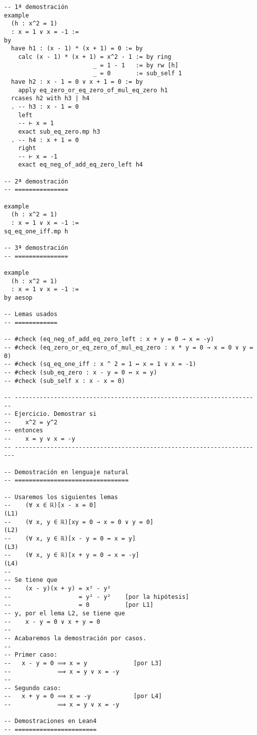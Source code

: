 \begin{verbatim}
-- 1ª demostración
example
  (h : x^2 = 1)
  : x = 1 ∨ x = -1 :=
by
  have h1 : (x - 1) * (x + 1) = 0 := by
    calc (x - 1) * (x + 1) = x^2 - 1 := by ring
                         _ = 1 - 1   := by rw [h]
                         _ = 0       := sub_self 1
  have h2 : x - 1 = 0 ∨ x + 1 = 0 := by
    apply eq_zero_or_eq_zero_of_mul_eq_zero h1
  rcases h2 with h3 | h4
  . -- h3 : x - 1 = 0
    left
    -- ⊢ x = 1
    exact sub_eq_zero.mp h3
  . -- h4 : x + 1 = 0
    right
    -- ⊢ x = -1
    exact eq_neg_of_add_eq_zero_left h4

-- 2ª demostración
-- ===============

example
  (h : x^2 = 1)
  : x = 1 ∨ x = -1 :=
sq_eq_one_iff.mp h

-- 3ª demostración
-- ===============

example
  (h : x^2 = 1)
  : x = 1 ∨ x = -1 :=
by aesop

-- Lemas usados
-- ============

-- #check (eq_neg_of_add_eq_zero_left : x + y = 0 → x = -y)
-- #check (eq_zero_or_eq_zero_of_mul_eq_zero : x * y = 0 → x = 0 ∨ y = 0)
-- #check (sq_eq_one_iff : x ^ 2 = 1 ↔ x = 1 ∨ x = -1)
-- #check (sub_eq_zero : x - y = 0 ↔ x = y)
-- #check (sub_self x : x - x = 0)

-- ---------------------------------------------------------------------
-- Ejercicio. Demostrar si
--    x^2 = y^2
-- entonces
--    x = y ∨ x = -y
-- ----------------------------------------------------------------------

-- Demostración en lenguaje natural
-- ================================

-- Usaremos los siguientes lemas
--    (∀ x ∈ ℝ)[x - x = 0]                                           (L1)
--    (∀ x, y ∈ ℝ)[xy = 0 → x = 0 ∨ y = 0]                           (L2)
--    (∀ x, y ∈ ℝ)[x - y = 0 ↔ x = y]                                (L3)
--    (∀ x, y ∈ ℝ)[x + y = 0 → x = -y]                               (L4)
--
-- Se tiene que
--    (x - y)(x + y) = x² - y²
--                   = y² - y²    [por la hipótesis]
--                   = 0          [por L1]
-- y, por el lema L2, se tiene que
--    x - y = 0 ∨ x + y = 0
--
-- Acabaremos la demostración por casos.
--
-- Primer caso:
--   x - y = 0 ⟹ x = y             [por L3]
--             ⟹ x = y ∨ x = -y
--
-- Segundo caso:
--   x + y = 0 ⟹ x = -y            [por L4]
--             ⟹ x = y ∨ x = -y

-- Demostraciones en Lean4
-- =======================


\end{verbatim}
